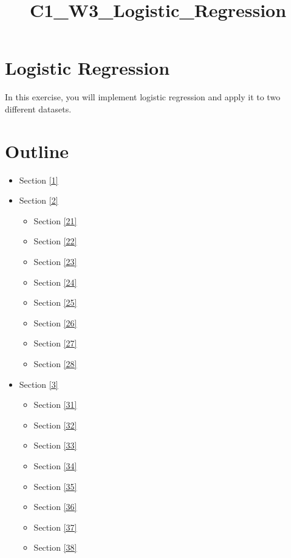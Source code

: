 \documentclass[11pt]{article}
\title{C1\_W3\_Logistic\_Regression}
\providecommand{\tightlist}{%
      \setlength{\itemsep}{0pt}\setlength{\parskip}{0pt}}
\begin{document}
    
    \maketitle
    
    

    
    \hypertarget{logistic-regression}{%
\section{Logistic Regression}\label{logistic-regression}}

In this exercise, you will implement logistic regression and apply it to
two different datasets.

\hypertarget{outline}{%
\section{Outline}\label{outline}}

\begin{itemize}
\tightlist
\item
  Section \ref{1}
\item
  Section \ref{2}

  \begin{itemize}
  \tightlist
  \item
    Section \ref{21}
  \item
    Section \ref{22}
  \item
    Section \ref{23}
  \item
    Section \ref{24}
  \item
    Section \ref{25}
  \item
    Section \ref{26}
  \item
    Section \ref{27}
  \item
    Section \ref{28}
  \end{itemize}
\item
  Section \ref{3}

  \begin{itemize}
  \tightlist
  \item
    Section \ref{31}
  \item
    Section \ref{32}
  \item
    Section \ref{33}
  \item
    Section \ref{34}
  \item
    Section \ref{35}
  \item
    Section \ref{36}
  \item
    Section \ref{37}
  \item
    Section \ref{38}
  \end{itemize}
\end{itemize}
\end{document}

